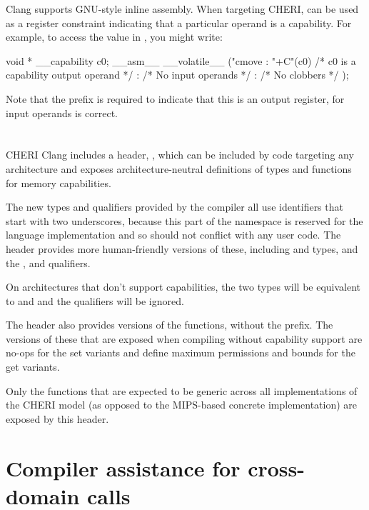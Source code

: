 Clang supports GNU-style inline assembly.
When targeting CHERI,  can be used as a register constraint indicating that a particular operand is a capability.
For example, to access the value in , you might write:

\begin{csnippet}
void * __capability c0;
__asm__ __volatile__ ("cmove %
	: "+C"(c0) /* c0 is a capability output operand */
	: /* No input operands */
	: /* No clobbers */
	);
\end{csnippet}

Note that the \ccode{+} prefix is required to indicate that this is an output register, for input operands  is correct.

\section{}

CHERI Clang includes a header, , which can be included by code targeting any architecture and exposes architecture-neutral definitions of types and functions for memory capabilities.

The new types and qualifiers provided by the compiler all use identifiers that start with two underscores, because this part of the namespace is reserved for the language implementation and so should not conflict with any user code.
The  header provides more human-friendly versions of these, including  and  types, and the ,  and  qualifiers.

On architectures that don't support capabilities, the two types will be equivalent to  and  and the qualifiers will be ignored.

The header also provides versions of the  functions, without the  prefix.
The versions of these that are exposed when compiling without capability support are no-ops for the set variants and define maximum permissions and bounds for the get variants.

Only the functions that are expected to be generic across all implementations of the CHERI model (as opposed to the MIPS-based concrete implementation) are exposed by this header.

\section{Compiler assistance for cross-domain calls}
\label{sec:cccall}

